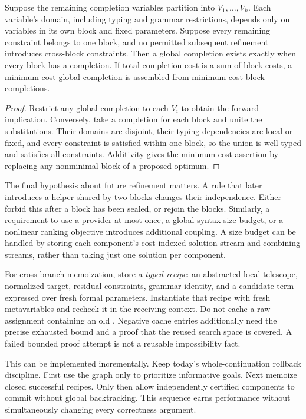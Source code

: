 \begin{proposition}\label{prop:factor}
Suppose the remaining completion variables partition into $V_1,\ldots,V_k$. Each variable's domain, including typing and grammar restrictions, depends only on variables in its own block and fixed parameters. Suppose every remaining constraint belongs to one block, and no permitted subsequent refinement introduces cross-block constraints. Then a global completion exists exactly when every block has a completion. If total completion cost is a sum of block costs, a minimum-cost global completion is assembled from minimum-cost block completions.
\end{proposition}
\begin{proof}
Restrict any global completion to each $V_i$ to obtain the forward implication. Conversely, take a completion for each block and unite the substitutions. Their domains are disjoint, their typing dependencies are local or fixed, and every constraint is satisfied within one block, so the union is well typed and satisfies all constraints. Additivity gives the minimum-cost assertion by replacing any nonminimal block of a proposed optimum.
\end{proof}

The final hypothesis about future refinement matters. A rule that later introduces a helper shared by two blocks changes their independence. Either forbid this after a block has been sealed, or rejoin the blocks. Similarly, a requirement to use a provider at most once, a global syntax-size budget, or a nonlinear ranking objective introduces additional coupling. A size budget can be handled by storing each component's cost-indexed solution stream and combining streams, rather than taking just one solution per component.

For cross-branch memoization, store a \emph{typed recipe}: an abstracted local telescope, normalized target, residual constraints, grammar identity, and a candidate term expressed over fresh formal parameters. Instantiate that recipe with fresh metavariables and recheck it in the receiving context. Do not cache a raw assignment containing an old . Negative cache entries additionally need the precise exhausted bound and a proof that the reused search space is covered. A failed bounded proof attempt is not a reusable impossibility fact.

This can be implemented incrementally. Keep today's whole-continuation rollback discipline. First use the graph only to prioritize informative goals. Next memoize closed successful recipes. Only then allow independently certified components to commit without global backtracking. This sequence earns performance without simultaneously changing every correctness argument.

